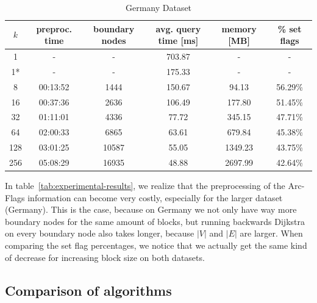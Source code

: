 \documentclass[acmsmall,nonacm,screen,review]{acmart}
\begin{document}
\begin{table}[bt!]
    \begin{subtable}{\textwidth} %
        \caption{Germany Dataset}
        \begin{tabular}{|c|c|c|c|c|c|}
            \hline
            $k$ & preproc. time & boundary nodes & avg. query time [ms] & memory [MB] & \% set flags \\
            \hline
            1 & - & - & 703.87 & - & - \\
            1* & - & - & 175.33 & - & - \\
            8 & 00:13:52 & 1444 & 150.67 & 94.13 & 56.29\% \\
            16 & 00:37:36 & 2636 & 106.49 & 177.80 & 51.45\% \\
            32 & 01:11:01 & 4336 & 77.72 & 345.15 & 47.71\% \\
            64 & 02:00:33 & 6865 & 63.61 & 679.84 & 45.38\% \\
            128 & 03:01:25 & 10587 & 55.05 & 1349.23 & 43.75\% \\
            256 & 05:08:29 & 16935 & 48.88 & 2697.99 & 42.64\% \\
            \hline
        \end{tabular}
    \end{subtable}

    
\end{table}


In table~\ref{tab:experimental-results}, we realize that the preprocessing of the Arc-Flags information can become very costly, especially for the larger dataset (Germany).
This is the case, because on Germany we not only have way more boundary nodes for the same amount of blocks, but running backwards Dijkstra on every boundary
node also takes longer, because $|V|$ and $|E|$ are larger. 
When comparing the set flag percentages, we notice that we actually get the same kind of decrease for increasing block size on both datasets. 

\subsection{Comparison of algorithms}
\end{document}
